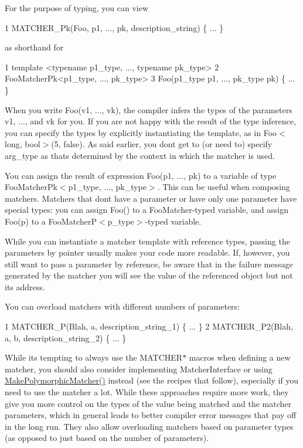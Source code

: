 For the purpose of typing, you can view 
\begin{DoxyCode}
1 MATCHER\_Pk(Foo, p1, ..., pk, description\_string) \{ ... \}
\end{DoxyCode}
 as shorthand for 
\begin{DoxyCode}
1 template <typename p1\_type, ..., typename pk\_type>
2 FooMatcherPk<p1\_type, ..., pk\_type>
3 Foo(p1\_type p1, ..., pk\_type pk) \{ ... \}
\end{DoxyCode}


When you write {\ttfamily Foo(v1, ..., vk)}, the compiler infers the types of the parameters {\ttfamily v1}, ..., and {\ttfamily vk} for you. If you are not happy with the result of the type inference, you can specify the types by explicitly instantiating the template, as in {\ttfamily Foo$<$long, bool$>$(5, false)}. As said earlier, you don\textquotesingle{}t get to (or need to) specify {\ttfamily arg\+\_\+type} as that\textquotesingle{}s determined by the context in which the matcher is used.

You can assign the result of expression {\ttfamily Foo(p1, ..., pk)} to a variable of type {\ttfamily Foo\+Matcher\+Pk$<$p1\+\_\+type, ..., pk\+\_\+type$>$}. This can be useful when composing matchers. Matchers that don\textquotesingle{}t have a parameter or have only one parameter have special types\+: you can assign {\ttfamily Foo()} to a {\ttfamily Foo\+Matcher}-\/typed variable, and assign {\ttfamily Foo(p)} to a {\ttfamily Foo\+MatcherP$<$p\+\_\+type$>$}-\/typed variable.

While you can instantiate a matcher template with reference types, passing the parameters by pointer usually makes your code more readable. If, however, you still want to pass a parameter by reference, be aware that in the failure message generated by the matcher you will see the value of the referenced object but not its address.

You can overload matchers with different numbers of parameters\+: 
\begin{DoxyCode}
1 MATCHER\_P(Blah, a, description\_string\_1) \{ ... \}
2 MATCHER\_P2(Blah, a, b, description\_string\_2) \{ ... \}
\end{DoxyCode}


While it\textquotesingle{}s tempting to always use the {\ttfamily M\+A\+T\+C\+H\+E\+R$\ast$} macros when defining a new matcher, you should also consider implementing {\ttfamily Matcher\+Interface} or using {\ttfamily \hyperlink{namespacetesting_a667ca94f190ec2e17ee2fbfdb7d3da04}{Make\+Polymorphic\+Matcher()}} instead (see the recipes that follow), especially if you need to use the matcher a lot. While these approaches require more work, they give you more control on the types of the value being matched and the matcher parameters, which in general leads to better compiler error messages that pay off in the long run. They also allow overloading matchers based on parameter types (as opposed to just based on the number of parameters).

